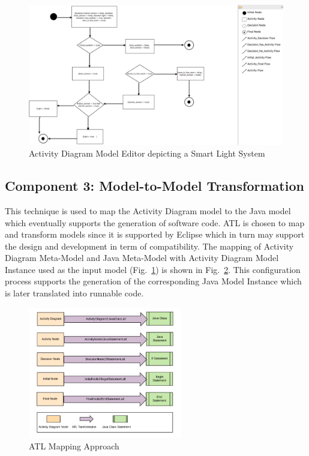 \begin{figure}[!h]
	\includegraphics[width=\textwidth]{figs/Activity_Diagram_Model_Editor}
	\caption{Activity Diagram Model Editor depicting a Smart Light System}
	\label{figure:modeleditor}
\end{figure}


\subsection{Component 3: Model-to-Model Transformation}
\label{Component 3: Model-to-Model Transformation}

This technique is used to map the Activity Diagram model to the Java model which eventually supports the generation of software code. ATL is chosen to map and transform models since it is supported by Eclipse which in turn may support the design and development in term of compatibility. The mapping of Activity Diagram Meta-Model and Java Meta-Model with Activity Diagram Model Instance used as the input model (Fig.~\ref{figure:modeleditor}) is shown in Fig.~\ref{figure:ATL_Mapping_Approach}. This configuration process supports the generation of the corresponding Java Model Instance which is later translated into runnable code.

\begin{figure}[!h]
\centering
	\includegraphics[width=0.6\textwidth]{figs/ATL_Mapping_Approach}
	\caption{ATL Mapping Approach}
	\label{figure:ATL_Mapping_Approach}
\end{figure}



